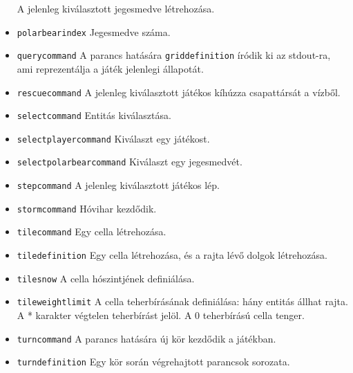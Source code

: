\begin{itemize}
A jelenleg kiválasztott jegesmedve létrehozása.
\item \texttt{polarbear\textunderscore{}index}
Jegesmedve száma.
\item \texttt{query\textunderscore{}command}
A parancs hatására \texttt{grid\textunderscore{}definition} íródik ki az stdout-ra, ami reprezentálja a játék jelenlegi állapotát.
\item \texttt{rescue\textunderscore{}command}
A jelenleg kiválasztott játékos kíhúzza csapattársát a vízből.
\item \texttt{select\textunderscore{}command}
Entitás kiválasztása.
\item \texttt{select\textunderscore{}player\textunderscore{}command}
Kiválaszt egy játékost.
\item \texttt{select\textunderscore{}polarbear\textunderscore{}command}
Kiválaszt egy jegesmedvét.
\item \texttt{step\textunderscore{}command}
A jelenleg kiválasztott játékos lép.
\item \texttt{storm\textunderscore{}command}
Hóvihar kezdődik.
\item \texttt{tile\textunderscore{}command}
Egy cella létrehozása.
\item \texttt{tile\textunderscore{}definition}
Egy cella létrehozása, és a rajta lévő dolgok létrehozása.
\item \texttt{tile\textunderscore{}snow}
A cella hószintjének definiálása.
\item \texttt{tile\textunderscore{}weight\textunderscore{}limit}
A cella teherbírásának definiálása: hány entitás állhat rajta. \newline A * karakter végtelen teherbírást jelöl. A 0 teherbírású cella tenger.
\item \texttt{turn\textunderscore{}command}
A parancs hatására új kör kezdődik a játékban.
\item \texttt{turn\textunderscore{}definition}
Egy kör során végrehajtott parancsok sorozata.
\end{itemize}


